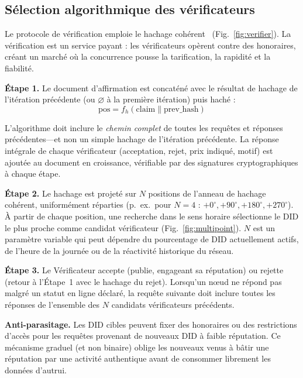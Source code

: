 \documentclass[11pt,a4paper,twocolumn]{article}
\begin{document}
\subsection{Sélection algorithmique des vérificateurs}

Le protocole de vérification emploie le hachage cohérent~\cite{karger1997} (Fig.~\ref{fig:verifier}). La vérification est un service payant : les vérificateurs opèrent contre des honoraires, créant un marché où la concurrence pousse la tarification, la rapidité et la fiabilité.

\textbf{Étape 1.} Le document d'affirmation est concaténé avec le résultat de hachage de l'itération précédente (ou $\varnothing$ à la première itération) puis haché :
\begin{equation}
\text{pos} = f_h(\text{claim} \| \text{prev\_hash})
\label{eq:hash}
\end{equation}

L'algorithme doit inclure le \emph{chemin complet} de toutes les requêtes et réponses précédentes---et non un simple hachage de l'itération précédente. La réponse intégrale de chaque vérificateur (acceptation, rejet, prix indiqué, motif) est ajoutée au document en croissance, vérifiable par des signatures cryptographiques à chaque étape.

\textbf{Étape 2.} Le hachage est projeté sur $N$ positions de l'anneau de hachage cohérent, uniformément réparties (p.\ ex.\ pour $N=4$ : $+0^{\circ}, +90^{\circ}, +180^{\circ}, +270^{\circ}$). À partir de chaque position, une recherche dans le sens horaire sélectionne le DID le plus proche comme candidat vérificateur (Fig.~\ref{fig:multipoint}). $N$ est un paramètre variable qui peut dépendre du pourcentage de DID actuellement actifs, de l'heure de la journée ou de la réactivité historique du réseau.

\textbf{Étape 3.} Le Vérificateur accepte (publie, engageant sa réputation) ou rejette (retour à l'Étape~1 avec le hachage du rejet). Lorsqu'un nœud ne répond pas malgré un statut en ligne déclaré, la requête suivante doit inclure toutes les réponses de l'ensemble des $N$ candidats vérificateurs précédents.

\textbf{Anti-parasitage.} Les DID cibles peuvent fixer des honoraires ou des restrictions d'accès pour les requêtes provenant de nouveaux DID à faible réputation. Ce mécanisme graduel (et non binaire) oblige les nouveaux venus à bâtir une réputation par une activité authentique avant de consommer librement les données d'autrui.
\end{document}
